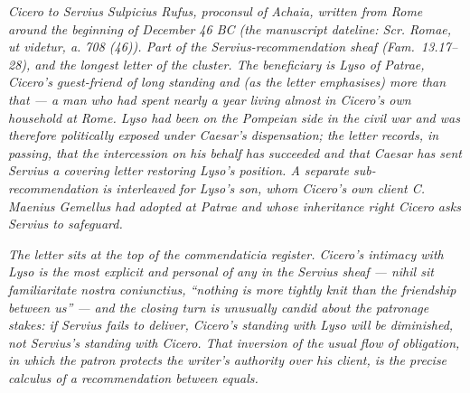 
\textit{Cicero to Servius Sulpicius Rufus, proconsul of
Achaia, written from Rome around the beginning of December
46 BC (the manuscript dateline: \textit{Scr. Romae, ut
videtur, a. 708 (46)}). Part of the Servius-recommendation
sheaf (Fam.\ 13.17--28), and the longest letter of the
cluster. The beneficiary is Lyso of Patrae, Cicero's
guest-friend of long standing and (as the letter
emphasises) more than that --- a man who had spent nearly
a year living almost in Cicero's own household at Rome.
Lyso had been on the Pompeian side in the civil war and
was therefore politically exposed under Caesar's
dispensation; the letter records, in passing, that the
intercession on his behalf has succeeded and that Caesar
has sent Servius a covering letter restoring Lyso's
position. A separate sub-recommendation is interleaved
for Lyso's son, whom Cicero's own client C. Maenius
Gemellus had adopted at Patrae and whose inheritance
right Cicero asks Servius to safeguard.}

\textit{The letter sits at the top of the
\textit{commendaticia} register. Cicero's intimacy with
Lyso is the most explicit and personal of any in the
Servius sheaf --- \textit{nihil sit familiaritate nostra
coniunctius}, ``nothing is more tightly knit than the
friendship between us'' --- and the closing turn is
unusually candid about the patronage stakes: if Servius
fails to deliver, Cicero's standing with Lyso will be
diminished, not Servius's standing with Cicero. That
inversion of the usual flow of obligation, in which the
patron protects the writer's authority over his client,
is the precise calculus of a recommendation between equals.}
